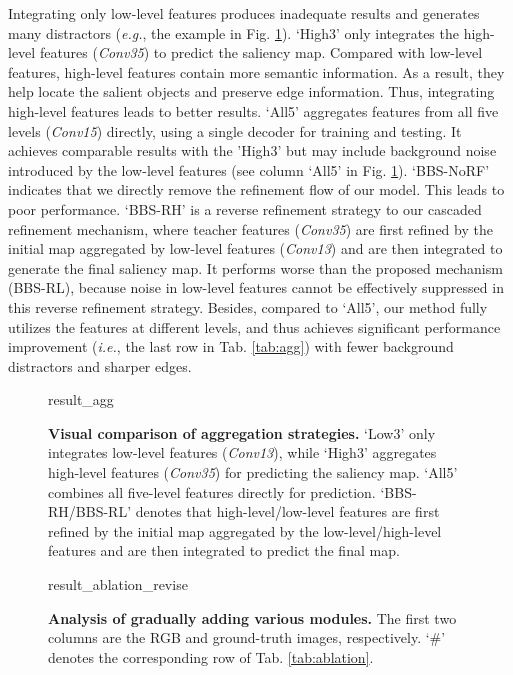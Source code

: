 \documentclass[journal]{IEEEtran}
\newcommand{\tabref}[1]{Tab. \ref{#1}}
\newcommand{\figref}[1]{Fig. \ref{#1}}
\def\ie{\emph{i.e.}}
\def\eg{\emph{e.g.}}
\begin{document}
Integrating only low-level features produces inadequate results
and generates many distractors
(\eg, the example in \figref{fig:visual_agg}). `High3' only integrates the high-level features (\textit{Conv3}\textit{5}) to predict the saliency map.
Compared with low-level features, high-level features contain more semantic information.
As a result, they help locate the salient objects and preserve edge information.
Thus, integrating high-level features leads to better results.
`All5' aggregates features from all five levels (\textit{Conv1}\textit{5}) directly, using a single decoder for training and testing.
It achieves comparable results with the 'High3' but may include background noise introduced by the low-level features (see column `All5' in \figref{fig:visual_agg}).
`BBS-NoRF' indicates that we directly remove the refinement flow of our model. This leads to poor performance.
`BBS-RH' is a reverse refinement strategy to our cascaded refinement mechanism, where teacher features (\textit{Conv3}\textit{5}) are first refined by the initial map aggregated by low-level features (\textit{Conv1}\textit{3}) and are then integrated to generate the final saliency map.
It performs worse than the proposed mechanism (BBS-RL), because noise in low-level features cannot be effectively suppressed in this reverse refinement strategy.
Besides, compared to `All5', our method fully utilizes the features at different levels, and thus achieves significant performance improvement (\ie, the last row in \tabref{tab:agg}) with fewer background distractors and sharper edges. \par
\begin{figure}[t!]
	\centering
	\begin{overpic}[width=1.0\linewidth]{result_agg}
	\end{overpic}
	\vspace{-20pt}
	\caption{ \textbf{Visual comparison of aggregation strategies.} `Low3' only integrates low-level features (\textit{Conv1}\textit{3}), while `High3' aggregates high-level features (\textit{Conv3}\textit{5}) for predicting the saliency map. `All5' combines all five-level features directly for prediction. `BBS-RH/BBS-RL' denotes that high-level/low-level features are first refined by the initial map aggregated by the low-level/high-level features and are then integrated to predict the final map.}
\label{fig:visual_agg}
\end{figure}
\begin{figure}[t!]
	\centering
	\begin{overpic}[width=1.0\linewidth]{result_ablation_revise}
	\end{overpic}
	\vspace{-20pt}
	\caption{\textbf{Analysis of gradually adding various modules.} The first two columns are the RGB and ground-truth images, respectively. `\#' denotes the corresponding row of \tabref{tab:ablation}. }
	\label{fig:visual_ablation}
\end{figure}
\end{document}
